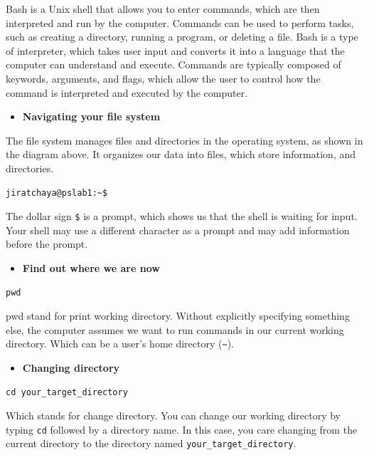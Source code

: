 \documentclass[
  letterpaper,
  DIV=11,
  numbers=noendperiod]{scrreprt}
\providecommand{\tightlist}{%
  \setlength{\itemsep}{0pt}\setlength{\parskip}{0pt}}\usepackage{longtable,booktabs,array}
\begin{document}
Bash is a Unix shell that allows you to enter commands, which are then
interpreted and run by the computer. Commands can be used to perform
tasks, such as creating a directory, running a program, or deleting a
file. Bash is a type of interpreter, which takes user input and converts
it into a language that the computer can understand and execute.
Commands are typically composed of keywords, arguments, and flags, which
allow the user to control how the command is interpreted and executed by
the computer.

\begin{itemize}
\tightlist
\item
  \textbf{Navigating your file system}
\end{itemize}

The file system manages files and directories in the operating system,
as shown in the diagram above. It organizes our data into files, which
store information, and directories.

\begin{verbatim}
jiratchaya@pslab1:~$
\end{verbatim}

The dollar sign \texttt{\$} is a prompt, which shows us that the shell
is waiting for input. Your shell may use a different character as a
prompt and may add information before the prompt.

\begin{itemize}
\tightlist
\item
  \textbf{Find out where we are now}
\end{itemize}

\begin{verbatim}
pwd
\end{verbatim}

pwd stand for print working directory. Without explicitly specifying
something else, the computer assumes we want to run commands in our
current working directory. Which can be a user's home directory
(\texttt{\textasciitilde{}}).

\begin{itemize}
\tightlist
\item
  \textbf{Changing directory}
\end{itemize}

\begin{verbatim}
cd your_target_directory
\end{verbatim}

Which stands for change directory. You can change our working directory
by typing \texttt{cd} followed by a directory name. In this case, you
care changing from the current directory to the directory named
\texttt{your\_target\_directory}.
\end{document}
